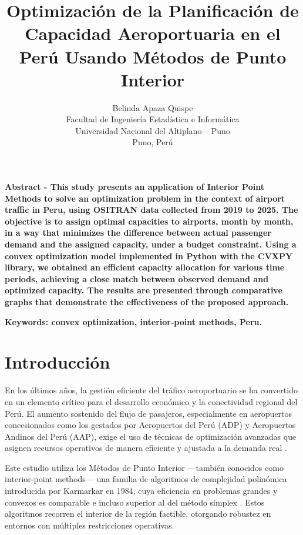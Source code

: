 \documentclass[11pt, a4paper, twocolumn]{article}
\title{\textbf{Optimización de la Planificación de Capacidad Aeroportuaria en el Perú Usando Métodos de Punto Interior}}
\author{Belinda Apaza Quispe\\
{\small Facultad de Ingeniería Estadística e Informática} \\
{\small Universidad Nacional del Altiplano – Puno} \\
{\small Puno, Perú}}
\date{}
\renewcommand{\abstractname}{}           %
\renewenvironment{abstract}{
  \small\itshape
}{\par}
\begin{document}
\maketitle

\begin{abstract}
\textbf{Abstract - This study presents an application of Interior Point Methods to solve an optimization problem in the context of airport traffic in Peru, using OSITRAN data collected from 2019 to 2025. The objective is to assign optimal capacities to airports, month by month, in a way that minimizes the difference between actual passenger demand and the assigned capacity, under a budget constraint. Using a convex optimization model implemented in Python with the CVXPY library, we obtained an efficient capacity allocation for various time periods, achieving a close match between observed demand and optimized capacity. The results are presented through comparative graphs that demonstrate the effectiveness of the proposed approach.}

\textbf{Keywords: convex optimization, interior‑point methods, Peru.}
\end{abstract}

\setcounter{secnumdepth}{0}

\renewenvironment{abstract}{
  \small
  \begin{center}\bfseries\abstractname\end{center}%
  \itshape
}{
  \par
}

\section{Introducción}

En los últimos años, la gestión eficiente del tráfico aeroportuario se ha convertido en un elemento crítico para el desarrollo económico y la conectividad regional del Perú. El aumento sostenido del flujo de pasajeros, especialmente en aeropuertos concesionados como los gestados por Aeropuertos del Perú (ADP) y Aeropuertos Andinos del Perú (AAP), exige el uso de técnicas de optimización avanzadas que asignen recursos operativos de manera eficiente y ajustada a la demanda real \citep{centreforaviation_peru}.

Este estudio utiliza los Métodos de Punto Interior —también conocidos como interior-point methods— una familia de algoritmos de complejidad polinómica introducida por Karmarkar en 1984, cuya eficiencia en problemas grandes y convexos es comparable e incluso superior al del método simplex \citep{karmarkar1984,newtonipm}. Estos algoritmos recorren el interior de la región factible, otorgando robustez en entornos con múltiples restricciones operativas.
\end{document}
